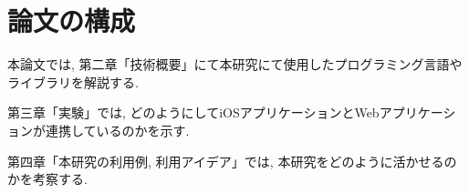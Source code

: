 \section{論文の構成}
本論文では, 第二章「技術概要」にて本研究にて使用したプログラミング言語やライブラリを解説する.

第三章「実験」では, どのようにしてiOSアプリケーションとWebアプリケーションが連携しているのかを示す.

第四章「本研究の利用例, 利用アイデア」では, 本研究をどのように活かせるのかを考察する.
